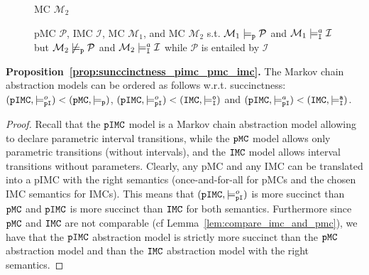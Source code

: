 \documentclass{llncs}
\newcommand{\mc}{\textnormal{MC}}
\newcommand{\imc}{\textnormal{IMC}}
\newcommand{\pimc}{\textnormal{pIMC}}
\newcommand{\pmc}{\textnormal{pMC}}
\newcommand{\pmcSet}{\ensuremath{\tt{pMC}}}
\newcommand{\imcSet}{\ensuremath{\tt{IMC}}}
\newcommand{\pimcSet}{\ensuremath{\tt{pIMC}}}
\newcommand{\satisfactionImcOnce}{\ensuremath{\models^{o}_{\tt{I}}}}
\newcommand{\satisfactionImc}{\ensuremath{\models^{a}_{\tt{I}}}}
\newcommand{\satisfactionPmc}{\ensuremath{\models_{\tt{p}}}}
\newcommand{\satisfactionPimc}{\ensuremath{\models^a_{\tt{pI}}}}
\newcommand{\satisfactionPimcOnce}{\ensuremath{\models^o_{\tt{pI}}}}
\begin{document}
\begin{figure}[t]
{\begin{minipage}[t]{.23\textwidth}
\begin{center}
{
}
{{\newline}{\mc} $\mathcal{M}_2$}
\end{center}
\end{minipage}}
\captionsetup{justification=centering}
\caption{
	{\pmc} $\mathcal{P}$, {\imc} $\mathcal{I}$,
    {\mc} $\mathcal{M}_1$, and {\mc} $\mathcal{M}_2$ s.t. \break
    $\mathcal{M}_1 \satisfactionPmc \mathcal{P}$ and $\mathcal{M}_1 \satisfactionImc \mathcal{I}$
    but
    $\mathcal{M}_2 \not\satisfactionPmc \mathcal{P}$ and $\mathcal{M}_2 \satisfactionImc \mathcal{I}$
    while $\mathcal{P}$ is entailed by $\mathcal{I}$
	\label{fig:pmc_with_no_eq_imc}
}%
\end{figure}

\begin{paragraph}{\textnormal{\textbf{Proposition~\ref{prop:sunccinctness_pimc_pmc_imc}.}}}
The Markov chain abstraction models can be ordered as follows w.r.t.
succinctness:
$({\pimcSet},\satisfactionPimcOnce) < (\pmcSet, \satisfactionPmc)$,
$({\pimcSet},\satisfactionPimcOnce) < (\imcSet, \satisfactionImcOnce)$ and
$({\pimcSet},\satisfactionPimc\nobreak) < (\imcSet, \satisfactionImc)$.
\end{paragraph}

\begin{proof}
Recall that the
{\pimcSet} model is a Markov chain abstraction model allowing to
declare parametric interval transitions, while the {\pmcSet} model
allows only parametric transitions (without intervals), and the
{\imcSet} model allows interval transitions without parameters.
Clearly, any {\pmc} and any {\imc} can be translated into a {\pimc}
with the right semantics (once-and-for-all for {\pmc}s and the chosen
{\imc} semantics for {\imc}s). This means that
$({\pimcSet},\satisfactionPimcOnce)$ is more succinct than {\pmcSet}
and {\pimcSet} is more succinct than {\imcSet} for both semantics.
Furthermore since {\pmcSet} and {\imcSet} are not comparable (cf Lemma~\ref{lem:compare_imc_and_pmc}), 
we have that the {\pimcSet}
abstraction model is strictly more succinct than the {\pmcSet}
abstraction model and than the {\imcSet} abstraction model with the
right semantics.\end{proof}
\end{document}
